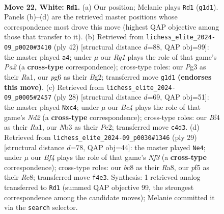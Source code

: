 \documentclass[11pt]{article}
\begin{document}
\clearpage

\begin{figure}[p]\centering
\begin{subfigure}{0.46\textwidth}\centering
\resizebox{\linewidth}{!}{%
\newchessgame
\chessboard[
  setfen={r1b4r/5k1p/ppn1p1p1/4Pp2/nbB2B2/1N3NP1/PP3P1P/RK4R1 w - - 4 22},
  showmover=false,
  pgfstyle=straightmove, color=movearrow, markmove={g1-d1}
]}
\caption{}
\end{subfigure}\hfill
\begin{subfigure}{0.46\textwidth}\centering
\resizebox{\linewidth}{!}{%
\newchessgame
\chessboard[
  setfen={r1b2rk1/pp3pp1/1bp4p/4P3/4NBn1/6P1/PP3PBP/R2R2K1 w - - 0 22},
  showmover=false,
  pgfstyle=straightmove, color=movearrow, markmove={a2-a4}
]}
\caption{}
\end{subfigure}
\\[4pt]
\begin{subfigure}{0.46\textwidth}\centering
\resizebox{\linewidth}{!}{%
\newchessgame
\chessboard[
  setfen={r1b1r1k1/1p2ppbp/p5p1/B1n5/P1p5/2N3P1/1P1NPPBP/R4RK1 w - - 0 15},
  showmover=false,
  pgfstyle=straightmove, color=movearrow, markmove={d2-c4}
]}
\caption{}
\end{subfigure}\hfill
\begin{subfigure}{0.46\textwidth}\centering
\resizebox{\linewidth}{!}{%
\newchessgame
\chessboard[
  setfen={r1r3k1/1p3ppp/p1nBpn2/2Pp1b2/3P4/4PNP1/1P3P1P/R3KB1R b KQ - 0 15},
  showmover=false,
  pgfstyle=straightmove, color=movearrow, markmove={f6-e4}
]}
\caption{}
\end{subfigure}
\caption{\textbf{Move 22, White: \texttt{Rd1}.} (a) Our position; Melanie plays \texttt{Rd1} (\texttt{g1d1}). Panels (b)--(d) are the retrieved master positions whose correspondence most drove this move (highest QAP objective among those that transfer to it). (b) Retrieved from \texttt{lichess\_elite\_2024-09\_p0020\#3410} (ply 42) [structural distance $d$=88, QAP obj=99]: the master played \texttt{a4}; under $\mu$ our \emph{Rg1} plays the role of that game's \emph{Pa2} (a \textbf{cross-type} correspondence); cross-type roles: our \emph{P}g3 as their \emph{R}a1, our \emph{p}g6 as their \emph{B}g2; transferred move \texttt{g1d1} \textbf{(endorses this move)}. (c) Retrieved from \texttt{lichess\_elite\_2024-09\_p0005\#2457} (ply 28) [structural distance $d$=69, QAP obj=51]: the master played \texttt{Nxc4}; under $\mu$ our \emph{Bc4} plays the role of that game's \emph{Nd2} (a \textbf{cross-type} correspondence); cross-type roles: our \emph{B}f4 as their \emph{R}a1, our \emph{N}b3 as their \emph{P}e2; transferred move \texttt{c4d3}. (d) Retrieved from \texttt{lichess\_elite\_2024-09\_p0030\#1346} (ply 29) [structural distance $d$=78, QAP obj=44]: the master played \texttt{Ne4}; under $\mu$ our \emph{Bf4} plays the role of that game's \emph{Nf3} (a \textbf{cross-type} correspondence); cross-type roles: our \emph{b}c8 as their \emph{R}a8, our \emph{p}f5 as their \emph{R}c8; transferred move \texttt{f4e3}. Synthesis: 1 retrieved analog transferred to \texttt{Rd1} (summed QAP objective 99, the strongest correspondence among the candidate moves); Melanie committed it via the \texttt{search} selector.}
\label{fig:thought-m42}
\end{figure}
\end{document}
